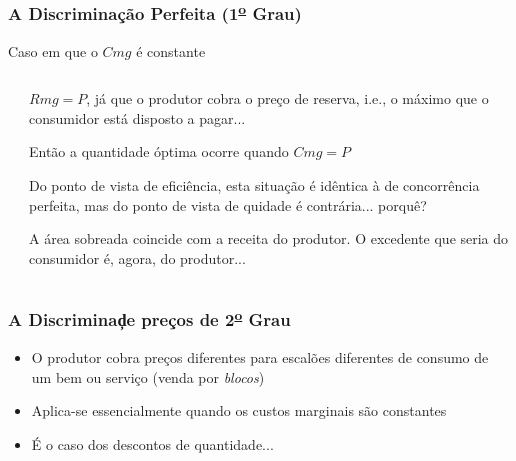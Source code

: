 \begin{frame}
	\frametitle{A Discrimina\c c\~ao Perfeita (1\textsuperscript{\underline{o}} Grau)}
	Caso em que o $Cmg$ \'e constante
	\begin{columns}
		\begin{column}{0.47\textwidth}
			\begin{center}
			\end{center}
		\end{column}
		\begin{column}{0.47\textwidth}
			\begin{itemize}
				{\footnotesize
				\item $Rmg=P$,  j\'a que o produtor cobra o pre\c co de reserva, i.e., o m\'aximo que o consumidor est\'a disposto a pagar...
				\item Ent\~ao a quantidade \'optima ocorre quando $Cmg=P$
				\item Do ponto de vista de efici\^encia, esta situa\c c\~ao \'e id\^entica \`a de concorr\^encia perfeita, mas do ponto de vista de quidade \'e contr\'aria... porqu\^e?
				\item A \'area sobreada coincide com a receita do produtor. O excedente que seria do consumidor \'e, agora, do produtor...
				}
			\end{itemize}
		\end{column}
	\end{columns}
\end{frame}

\begin{frame}
	\frametitle{A Discrimina\c de pre\c cos de 2\textsuperscript{\underline{o}} Grau}
	\begin{itemize}
		\setlength{\itemsep}{1.5em}
		\item O produtor cobra pre\c cos diferentes para escal\~oes diferentes de consumo de um bem ou servi\c co (venda por \emph{blocos})
		\item Aplica-se essencialmente quando os custos marginais s\~ao constantes
		\item \'E o caso dos descontos de quantidade...
	\end{itemize}
\end{frame}

